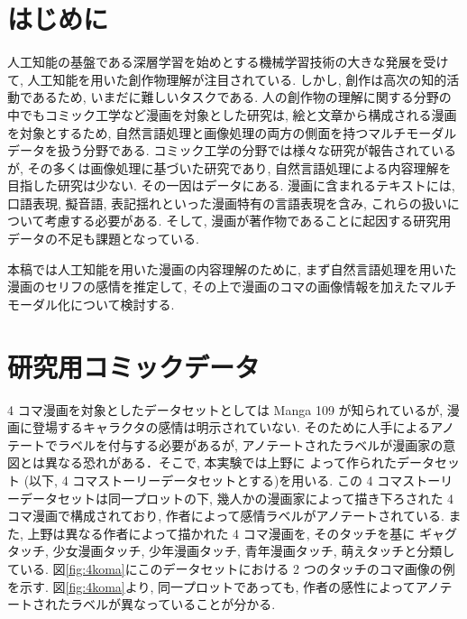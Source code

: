 \documentclass[twocolumn]{jarticle}     %
\begin{document}

\section{はじめに}
人工知能の基盤である深層学習を始めとする機械学習技術の大きな発展を受けて, 人工知能を用いた創作物理解が注目されている. しかし, 創作は高次の知的活動であるため, いまだに難しいタスクである.
人の創作物の理解に関する分野の中でもコミック工学など漫画を対象とした研究は, 絵と文章から構成される漫画を対象とするため, 自然言語処理と画像処理の両方の側面を持つマルチモーダルデータを扱う分野である. コミック工学の分野では様々な研究が報告されているが, その多くは画像処理に基づいた研究であり, 自然言語処理による内容理解を目指した研究は少ない. その一因はデータにある. 漫画に含まれるテキストには, 口語表現, 擬音語, 表記揺れといった漫画特有の言語表現を含み, これらの扱いについて考慮する必要がある. そして, 漫画が著作物であることに起因する研究用データの不足も課題となっている.

本稿では人工知能を用いた漫画の内容理解のために, まず自然言語処理を用いた漫画のセリフの感情を推定して, その上で漫画のコマの画像情報を加えたマルチモーダル化について検討する.

\section{研究用コミックデータ}
4 コマ漫画を対象としたデータセットとしては Manga 109 が知られているが, 漫画に登場するキャラクタの感情は明示されていない. そのために人手によるアノテートでラベルを付与する必要があるが, アノテートされたラベルが漫画家の意図とは異なる恐れがある．そこで, 本実験では上野に
よって作られたデータセット\cite{ueno_miki2018} (以下, 4 コマストーリーデータセットとする)を用いる. この 4 コマストーリーデータセットは同一プロットの下, 幾人かの漫画家によって描き下ろされた 4 コマ漫画で構成されており, 作者によって感情ラベルがアノテートされている.
また, 上野は異なる作者によって描かれた 4 コマ漫画を, そのタッチを基に
ギャグタッチ, 少女漫画タッチ, 少年漫画タッチ, 青年漫画タッチ, 萌えタッチと分類している. 図\ref{fig:4koma}にこのデータセットにおける 2 つのタッチのコマ画像の例を示す. 図\ref{fig:4koma}より, 同一プロットであっても, 作者の感性によってアノテートされたラベルが異なっていることが分かる.
\end{document}
